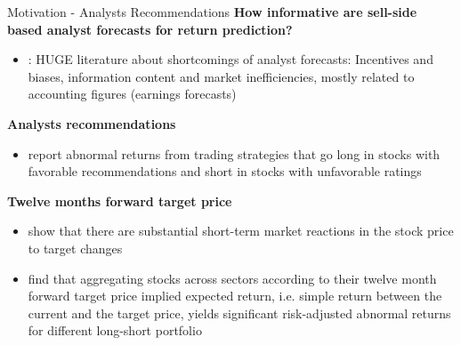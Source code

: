 \documentclass[9pt,xcolor=x11names,compress]{beamer}
\newcommand{\bbtext}[1]{\textcolor{dblue}{\textbf{#1}}}
\let\oldcite=\cite
\renewcommand{\cite}[1]{\textcolor{dblue}{\oldcite{#1}}}
\theoremstyle{standard}
\theoremstyle{notes}
\begin{document}
\begin{frame}{Motivation - Analysts Recommendations}
\textbf{How informative are sell-side based analyst forecasts for return prediction?}
\begin{itemize}
	\item \cite{ramnath2008}: HUGE literature about shortcomings of analyst forecasts: Incentives and biases, information content and market inefficiencies, mostly related to accounting figures (earnings forecasts)
\end{itemize}
\pause\bbtext{Analysts recommendations}
\begin{itemize}
	\item \cite{barber2001,green2006, cvitanic2006} report abnormal returns from trading strategies that go long in stocks with favorable recommendations and short in stocks with unfavorable ratings
\end{itemize}
\pause\bbtext{Twelve months forward target price}
\begin{itemize}
	\item \cite{brav2003} show that there are substantial short-term market reactions in the stock price to target changes
	\item \cite{da2011} find that aggregating stocks across sectors according to their twelve month forward target price implied expected return, i.e. simple return between the current and the target price, yields significant risk-adjusted abnormal returns for different long-short portfolio
\end{itemize}
\end{frame}

\end{document}
